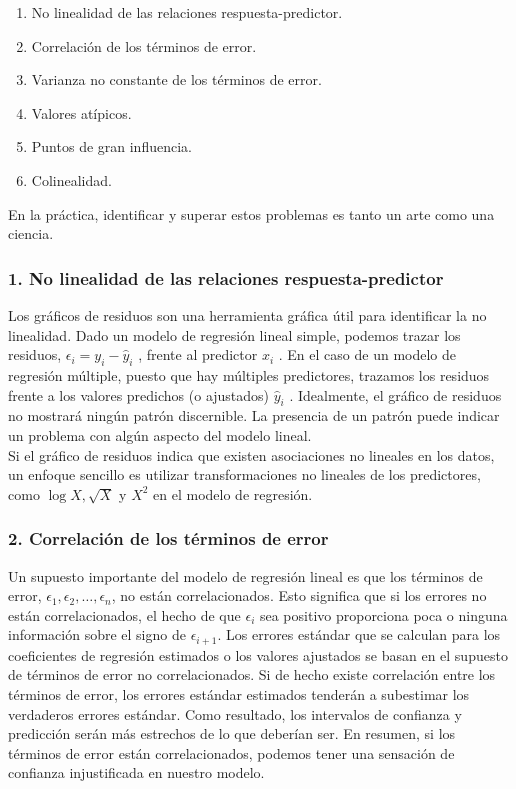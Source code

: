 \begin{enumerate}[1.]
    \item No linealidad de las relaciones respuesta-predictor.
    \item Correlación de los términos de error.
    \item Varianza no constante de los términos de error.
    \item Valores atípicos.
    \item Puntos de gran influencia.
    \item Colinealidad.
\end{enumerate}
En la práctica, identificar y superar estos problemas es tanto un arte como una ciencia.

\subsubsection{1. No linealidad de las relaciones respuesta-predictor}

Los gráficos de residuos son una herramienta gráfica útil para identificar la no linealidad. Dado un modelo de regresión lineal simple, podemos trazar los residuos, $\epsilon_i = y_i-\hat{y}_i$ , frente al predictor $x_i$ . En el caso de un modelo de regresión múltiple, puesto que hay múltiples predictores, trazamos los residuos frente a los valores predichos (o ajustados) $\hat{y}_i$ . Idealmente, el gráfico de residuos no mostrará ningún patrón discernible. La presencia de un patrón puede indicar un problema con algún aspecto del modelo lineal.\\

Si el gráfico de residuos indica que existen asociaciones no lineales en los datos, un enfoque sencillo es utilizar transformaciones no lineales de los predictores, como $\log X,\sqrt{X}$ y $X^2$ en el modelo de regresión. 

\subsubsection{2. Correlación de los términos de error}
Un supuesto importante del modelo de regresión lineal es que los términos de error, $\epsilon_1,\epsilon_2,\ldots,\epsilon_n$, no están correlacionados. Esto significa que si los errores no están correlacionados, el hecho de que $\epsilon_i$ sea positivo proporciona poca o ninguna información sobre el signo de $\epsilon_{i+1}$. Los errores estándar que se calculan para los coeficientes de regresión estimados o los valores ajustados se basan en el supuesto de términos de error no correlacionados. Si de hecho existe correlación entre los términos de error, los errores estándar estimados tenderán a subestimar los verdaderos errores estándar. Como resultado, los intervalos de confianza y predicción serán más estrechos de lo que deberían ser. En resumen, si los términos de error están correlacionados, podemos tener una sensación de confianza injustificada en nuestro modelo.\\


